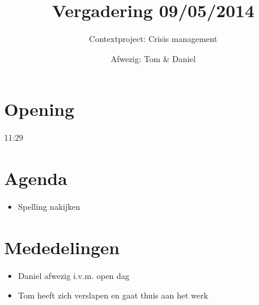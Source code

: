 \documentclass{article}
\begin{document}
\title{Vergadering 09/05/2014}
\author{Contextproject: Crisis management}
\date{Afwezig: Tom \& Daniel}
\maketitle 

\section{Opening} 
11:29

\section{Agenda}
\begin{itemize}
\item Spelling nakijken
\end{itemize}

\section{Mededelingen}
\begin{itemize}
\item Daniel afwezig i.v.m. open dag
\item Tom heeft zich verslapen en gaat thuis aan het werk
\end{itemize}
\end{document}
